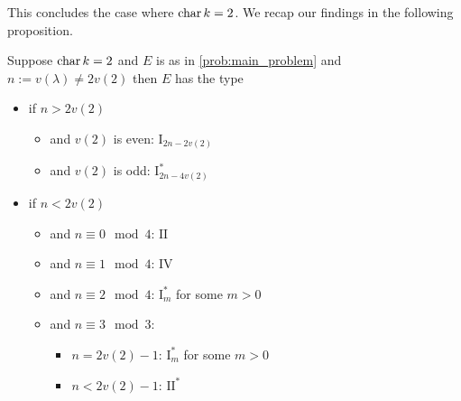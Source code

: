 This concludes the case where $\operatorname{char} k = 2$. 
We recap our findings in the following proposition.

\begin{proposition}
	Suppose $\operatorname{char} k = 2$ and $E$ is as in \cref{prob:main_problem} and $n:= v(\lambda) \ne 2v(2)$
	then $E$ has the type
	\begin{itemize}
		\item if $n > 2v(2)$
			\begin{itemize}
				\item and $v(2)$ is even: $\mathrm I_{2n -2 v(2)}$
				\item and $v(2)$ is odd: $\mathrm I_{2n - 4v(2)}^*$
			\end{itemize}
		\item if $n < 2v(2)$ 
			\begin{itemize}
				\item and $n \equiv 0 \mod 4$:  $\mathrm {II}$
				\item and  $n \equiv 1 \mod 4$:  $\mathrm {IV}$
				\item and $n \equiv 2 \mod 4$:  $\mathrm I^*_m$ for some $m > 0$
				\item and $n\equiv 3 \mod 3$: 
					\begin{itemize}
						\item $n = 2v(2) - 1$:  $\mathrm I_m^*$ for some $m > 0$ 
						\item $n < 2v(2) - 1$: $\mathrm {II}^*$
					\end{itemize}
			\end{itemize}
	\end{itemize}
\end{proposition}
